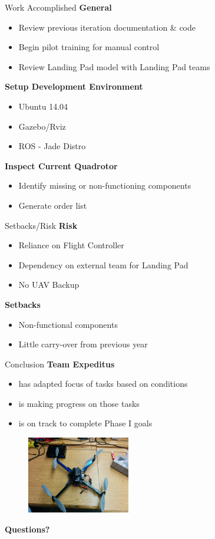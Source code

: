 \documentclass[11pt]{beamer}
\begin{document}
\begin{frame}{Work Accomplished}
\textbf{General}
\begin{itemize}
\item Review previous iteration documentation \& code
\item Begin pilot training for manual control
\item Review Landing Pad model with Landing Pad teams
\end{itemize}
\vspace{4mm}
\textbf{Setup Development Environment}
\begin{itemize}
\item Ubuntu 14.04
\item Gazebo/Rviz
\item ROS - Jade Distro
\end{itemize}
\vspace{4mm}
\textbf{Inspect Current Quadrotor}
\begin{itemize}
\item Identify missing or non-functioning components 
\item Generate order list
\end{itemize}
\end{frame}

\begin{frame}{Setbacks/Risk}
\textbf{Risk}
\begin{itemize}
\item Reliance on Flight Controller
\item Dependency on external team for Landing Pad
\item No UAV Backup
\end{itemize}
\vspace{6mm}
\textbf{Setbacks}
\begin{itemize}
\item Non-functional components
\item Little carry-over from previous year
\end{itemize}
\end{frame}

\begin{frame}[t]{Conclusion}
\textbf{Team Expeditus}
\begin{itemize}
\item has adapted focus of tasks based on conditions
\item is making progress on those tasks
\item is on track to complete Phase I goals
\end{itemize}

\begin{figure}
    \centering
    \includegraphics[width=0.4\textwidth]{images/quad}
\end{figure}

\end{frame}

\begin{frame}
\center \Large{{\textbf{Questions?}}}
\end{frame}
\end{document}
